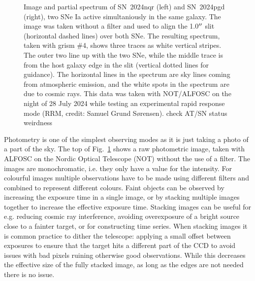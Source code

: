 \documentclass[a4paper,oneside,12pt, class=Latex/Classes/PhDthesisPSnPDF, crop=false]{standalone}
\begin{document}
\begin{figure}
    \caption{Image and partial spectrum of SN~2024nqr (left) and SN~2024pgd (right), two SNe Ia active simultaniously in the same galaxy. The image was taken without a filter and used to align the 1.0$^{\prime\prime}$ slit (horizontal dashed lines) over both SNe. The resulting spectrum, taken with grism \#4, shows three traces as white vertical stripes. The outer two line up with the two SNe, while the middle trace is from the host galaxy edge in the slit (vertical dotted lines for guidance). The horizontal lines in the spectrum are sky lines coming from atmospheric emission, and the white spots in the spectrum are due to cosmic rays. This data was taken with NOT/ALFOSC on the night of 28 July 2024 while testing an experimental rapid response mode (RRM, credit: Samuel Grund S\o rensen). \color{red}check AT/SN status weirdness \color{black}}
    \label{phot_spec_example}
\end{figure}


Photometry is one of the simplest observing modes as it is just taking a photo of a part of the sky. The top of Fig.~\ref{phot_spec_example} shows a raw photometric image, taken with ALFOSC on the Nordic Optical Telescope (NOT) without the use of a filter. The images are monochromatic, i.e. they only have a value for the intensity. For colourful images multiple observations have to be made using different filters and combined to represent different colours. Faint objects can be observed by increasing the exposure time in a single image, or by stacking multiple images together to increase the effective exposure time. Stacking images can be useful for e.g. reducing cosmic ray interference, avoiding overexposure of a bright source close to a fainter target, or for constructing time series. When stacking images it is common practice to dither the telescope: applying a small offset between exposures to ensure that the target hits a different part of the CCD to avoid issues with bad pixels ruining otherwise good observations. While this decreases the effective size of the fully stacked image, as long as the edges are not needed there is no issue.
\end{document}
